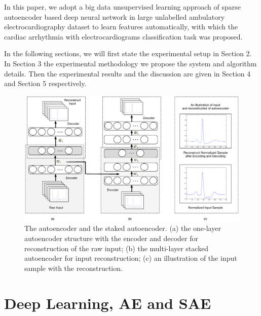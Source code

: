 \documentclass[journal]{IEEEtran}
\begin{document}
In this paper, we adopt a big data unsupervised learning approach of sparse autoencoder based deep neural network in large unlabelled ambulatory electrocardiography dataset to learn features automatically, with which the cardiac arrhythmia with electrocardiograms classification task was proposed. 

In the following sections, we will first state the experimental setup in Section 2. In Section 3 the experimental methodology we propose the system and algorithm details. Then the experimental results and the discussion are given in Section 4 and Section 5 respectively.

\begin{figure}[]
\centering
\includegraphics[width=7 in]{eps/figure2.eps}
\caption{The autoencoder and the staked autoencoder. (a) the one-layer autoencoder structure with the encoder and decoder for reconstruction of the raw input; (b) the multi-layer stacked autoencoder for input reconstruction; (c) an illustration of the input sample with the reconstruction.}
\label{figure1}
\end{figure}

\section{Deep Learning, AE and SAE}
\end{document}
